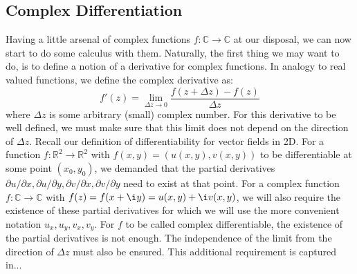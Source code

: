 \subsection{Complex Differentiation}
Having a little arsenal of complex functions $f: \mathbb{C} \rightarrow \mathbb{C}$ at our disposal, we can now start to do some calculus with them. Naturally, the first thing we may want to do, is to define a notion of a derivative for complex functions. In analogy to real valued functions, we define the complex derivative as:
\begin{equation}
  f'(z)	= \lim_{\Delta z \rightarrow 0 }
  \frac{f(z + \Delta z) - f(z)}{\Delta z}
\end{equation}
where $\Delta z$ is some arbitrary (small) complex number. For this derivative to be well defined, we must make sure that this limit does not depend on the direction of $\Delta z$. Recall our definition of differentiability for vector fields in 2D. For a function $f: \mathbb{R}^2 \rightarrow \mathbb{R}^2$ with $f(x,y) = (u(x,y), v(x,y))$ to be differentiable at some point $(x_0, y_0)$, we demanded that the partial derivatives $\partial u / \partial x, \partial u / \partial y, \partial v / \partial x, \partial v / \partial y$ need to exist at that point. For a complex function $f: \mathbb{C} \rightarrow \mathbb{C}$ with $f(z) = f(x + \i y) = u(x,y) + \i v(x,y)$, we will also require the existence of these partial derivatives for which we will use the more convenient notation $u_x, u_y, v_x, v_y$. For $f$ to be called complex differentiable, the existence of the partial derivatives is not enough. The independence of the limit from the direction of $\Delta z$ must also be ensured. This additional requirement is captured in...

